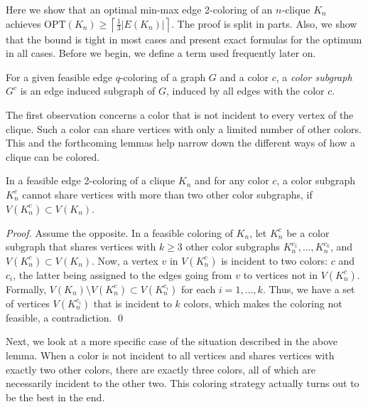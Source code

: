 \documentclass[runningheads, a4paper]{llncs}
\begin{document}
Here we show that an optimal min-max edge 2-coloring of an $n$-clique $K_n$ achieves OPT$(K_n) \geq \left\lceil \frac{1}{3}|E(K_n)| \right\rceil$. The proof is split in parts. Also, we show that the bound is tight in most cases and present exact formulas for the optimum in all cases. Before we begin, we define a term used frequently later on.



\begin{definition}\label{def:color-subgraph}
For a given feasible edge $q$-coloring of a graph $G$ and a color $c$, a \textit{color subgraph} $G^{c}$ is an edge induced subgraph of $G$, induced by all edges with the color $c$.
\end{definition}

The first observation concerns a color that is not incident to every vertex of the clique. Such a color can share vertices with only a limited number of other colors. This and the forthcoming lemmas help narrow down the different ways of how a clique can be colored. 

\begin{lemma}\label{lemma:clique1}
In a feasible edge 2-coloring of a clique $K_n$ and for any color $c$, a color subgraph $K_n^{c}$ cannot share vertices with more than two other color subgraphs, if $V(K_n^{c}) \subset V(K_n)$.
\end{lemma}
\begin{proof}
Assume the opposite. In a feasible coloring of $K_n$, let $K_n^{c}$ be a color subgraph that shares vertices with $k \geq 3$ other color subgraphs $K_n^{c_1}, \ldots, K_n^{c_k}$, and $V(K_n^{c}) \subset V(K_n)$. Now, a vertex $v$ in $V(K_n^c)$ is incident to two colors: $c$ and $c_i$, the latter being assigned to the edges going from $v$ to vertices not in $V(K_n^c)$.  Formally, $V(K_n) \setminus V(K_n^{c}) \subset V(K_n^{c_i})$ for each $i = 1, \ldots, k$. Thus, we have a set of vertices $V(K_n^{c_i})$ that is incident to $k$ colors, which makes the coloring not feasible, a contradiction. \qed
\end{proof}

Next, we look at a more specific case of the situation described in the above lemma. When a color is not incident to all vertices and shares vertices with exactly two other colors, there are exactly three colors, all of which are necessarily incident to the other two. This coloring strategy actually turns out to be the best in the end.
\end{document}
